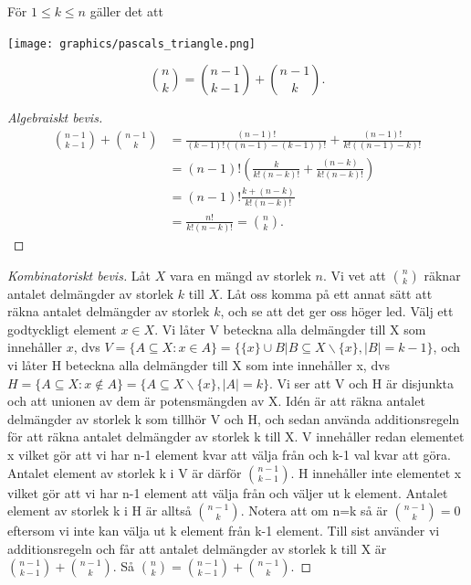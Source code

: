 \documentclass[nobib]{tufte-handout}
\begin{document}
\begin{proposition}
  För $1 \leq k \leq n$ gäller det att
  
  \begin{marginfigure}
    \texttt{[image: graphics/pascals\_triangle.png]}
  \end{marginfigure}
  $$\binom{n}{k} = \binom{n-1}{k-1} + \binom{n-1}{k}.$$ 

  \begin{proof}[Algebraiskt bevis]
    \begin{align*}
      \binom{n-1}{k-1} + \binom{n-1}{k} &= \frac{(n-1)!}{(k-1)!((n-1)-(k-1))!} + \frac{(n-1)!}{k!((n-1)-k)!}\\
      &= (n-1)!\left(\frac{k}{k!(n-k)!} + \frac{(n-k)}{k!(n-k)!}\right)\\
      &= (n-1)!\frac{k + (n - k)}{k!(n-k)!}\\
      &= \frac{n!}{k!(n-k)!} = \binom{n}{k}.
    \end{align*}   
  \end{proof}

  \begin{proof}[Kombinatoriskt bevis]
    Låt $X$ vara en mängd av storlek $n$. Vi vet att $\binom{n}{k}$ räknar antalet delmängder av storlek $k$ till $X$. Låt oss komma på ett annat sätt att räkna antalet delmängder av storlek $k$, och se att det ger oss höger led.
    Välj ett godtyckligt element $x \in X$. Vi låter V beteckna alla delmängder till X som innehåller $x$, dvs $V=\{A\subseteq X:x\in A\} =\{ \{ x\} \cup B | B \subseteq X \backslash \{ x\} , |B|=k-1\}$, och vi låter H beteckna alla delmängder till X som inte innehåller x, dvs $H=\{A\subseteq X:x\notin A\} =\{A \subseteq X \backslash \{ x\} , |A|=k\}$. Vi ser att V och H är disjunkta och att unionen av dem är potensmängden av X. Idén är att räkna antalet delmängder av storlek k som tillhör V och H, och sedan använda additionsregeln för att räkna antalet delmängder av storlek k till X. 
    V innehåller redan elementet x vilket gör att vi har n-1 element kvar att välja från och k-1 val kvar att göra. Antalet element av storlek k i V är därför $\binom{n-1}{k-1}$.
    H innehåller inte elementet x vilket gör att vi har n-1 element att välja från och väljer ut k element. Antalet element av storlek k i H är alltså $\binom{n-1}{k}$. Notera att om n=k så är $\binom{n-1}{k}=0$ eftersom vi inte kan välja ut k element från k-1 element. 
    Till sist använder vi additionsregeln och får att antalet delmängder av storlek k till X är $\binom{n-1}{k-1} +\binom{n-1}{k}$. Så $\binom{n}{k}=\binom{n-1}{k-1}+\binom{n-1}{k}$. 
  \end{proof}
\end{proposition}
\end{document}
